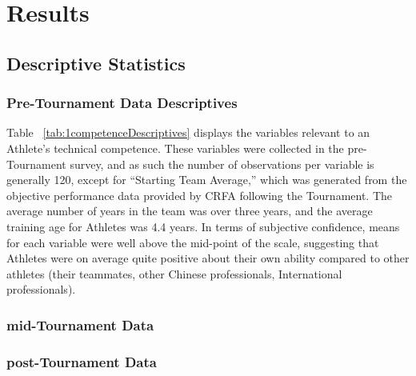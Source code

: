 \section{Results}


\subsection{Descriptive Statistics}

\subsubsection{\label{app5:descriptivesPre}Pre-Tournament Data Descriptives}



Table ~\ref{tab:1competenceDescriptives} displays the variables relevant to an Athlete's technical competence.  These variables were collected in the pre-Tournament survey, and as such the number of observations per variable is generally 120, except for ``Starting Team Average,'' which was generated from the objective performance data provided by CRFA following the Tournament.  The average number of years in the team was over three years, and the average training age for Athletes was 4.4 years.  In terms of subjective confidence, means for each variable were well above the mid-point of the scale, suggesting that Athletes were on average quite positive about their own ability compared to other athletes (their teammates, other Chinese professionals, International professionals).

\subsubsection{mid-Tournament Data}



\subsubsection{post-Tournament Data}











